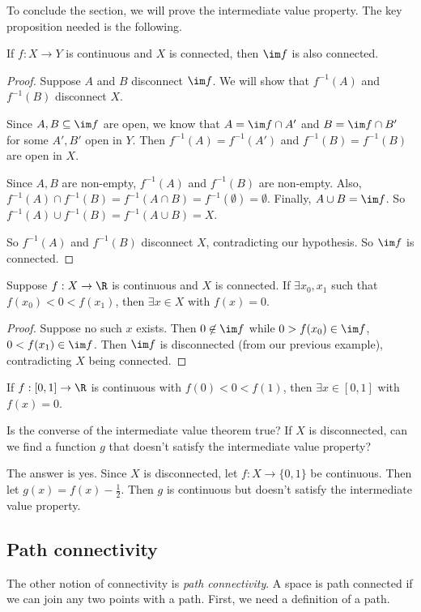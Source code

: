 \documentclass[a4paper]{article}
\begin{document}
To conclude the section, we will prove the intermediate value property. The key proposition needed is the following.
\begin{prop}
  If $f: X\to Y$ is continuous and $X$ is connected, then $\im f$ is also connected.
\end{prop}

\begin{proof}
  Suppose $A$ and $B$ disconnect $\im f$. We will show that $f^{-1}(A)$ and $f^{-1}(B)$ disconnect $X$.

  Since $A, B\subseteq \im f$ are open, we know that $A = \im f\cap A'$ and $B = \im f\cap B'$ for some $A', B'$ open in $Y$. Then $f^{-1}(A) = f^{-1}(A')$ and $f^{-1}(B) = f^{-1}(B)$ are open in $X$.

  Since $A, B$ are non-empty, $f^{-1}(A)$ and $f^{-1}(B)$ are non-empty. Also, $f^{-1}(A) \cap f^{-1}(B) = f^{-1}(A\cap B) = f^{-1}(\emptyset) = \emptyset$. Finally, $A\cup B = \im f$. So $f^{-1}(A)\cup f^{-1}(B) = f^{-1}(A\cup B) = X$.

  So $f^{-1}(A)$ and $f^{-1}(B)$ disconnect $X$, contradicting our hypothesis. So $\im f$ is connected.
\end{proof}

\begin{thm}
  Suppose $f: X\to \R$ is continuous and $X$ is connected. If $\exists x_0, x_1$ such that $f(x_0) < 0 < f(x_1)$, then $\exists x\in X$ with $f(x) = 0$.
\end{thm}

\begin{proof}
  Suppose no such $x$ exists. Then $0\not\in \im f$ while $0 > f(x_0) \in \im f$, $0 < f(x_1) \in \im f$. Then $\im f$ is disconnected (from our previous example), contradicting $X$ being connected.
\end{proof}

\begin{cor}
  If $f: [0, 1] \to \R$ is continuous with $f(0) < 0 < f(1)$, then $\exists x\in [0, 1]$ with $f(x) = 0$.
\end{cor}
Is the converse of the intermediate value theorem true? If $X$ is disconnected, can we find a function $g$ that doesn't satisfy the intermediate value property?

The answer is yes. Since $X$ is disconnected, let $f: X\to \{0, 1\}$ be continuous. Then let $g(x) = f(x) - \frac{1}{2}$. Then $g$ is continuous but doesn't satisfy the intermediate value property.

\subsection{Path connectivity}
The other notion of connectivity is \emph{path connectivity}. A space is path connected if we can join any two points with a path. First, we need a definition of a path.
\end{document}
